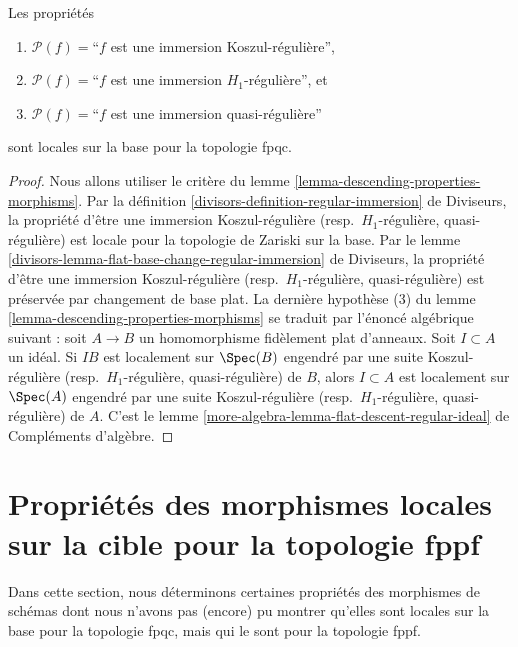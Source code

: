 \begin{lemma}
\label{lemma-descending-property-regular-immersion}
Les propriétés
\begin{enumerate}
\item[] $\mathcal{P}(f) =$``$f$ est une immersion Koszul-régulière'',
\item[] $\mathcal{P}(f) =$``$f$ est une immersion $H_1$-régulière'', et
\item[] $\mathcal{P}(f) =$``$f$ est une immersion quasi-régulière''
\end{enumerate}
sont locales sur la base pour la topologie fpqc.
\end{lemma}

\begin{proof}
Nous allons utiliser le critère du
lemme \ref{lemma-descending-properties-morphisms}.
Par la définition \ref{divisors-definition-regular-immersion} de Diviseurs,
la propriété d'être une immersion Koszul-régulière
(resp.\ $H_1$-régulière, quasi-régulière) est locale pour la topologie de
Zariski sur la base. Par le
lemme \ref{divisors-lemma-flat-base-change-regular-immersion} de Diviseurs,
la propriété d'être une immersion Koszul-régulière
(resp.\ $H_1$-régulière, quasi-régulière)
est préservée par changement de base plat.
La dernière hypothèse (3) du
lemme \ref{lemma-descending-properties-morphisms}
se traduit par l'énoncé algébrique suivant :
soit $A \to B$ un homomorphisme fidèlement plat d'anneaux.
Soit $I \subset A$ un idéal.
Si $IB$ est localement sur $\Spec(B)$ engendré par une suite Koszul-régulière
(resp.\ $H_1$-régulière, quasi-régulière) de $B$, alors $I \subset A$
est localement sur $\Spec(A)$ engendré par une suite Koszul-régulière
(resp.\ $H_1$-régulière, quasi-régulière) de $A$. C'est le
lemme \ref{more-algebra-lemma-flat-descent-regular-ideal}
de Compléments d'algèbre.
\end{proof}





\section{Propriétés des morphismes locales sur la cible pour la topologie fppf}
\label{section-descending-properties-morphisms-fppf}

\noindent
Dans cette section, nous déterminons certaines propriétés des morphismes de
schémas dont nous n'avons pas (encore) pu montrer qu'elles sont locales sur la
base pour la topologie fpqc, mais qui le sont pour la topologie fppf.

